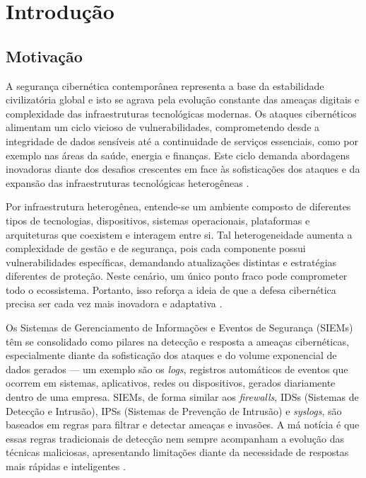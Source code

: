 
\chapter{Introdução}\label{cap:introducao}

\section{Motivação}\label{sec:consideracoesIniciais}

A segurança cibernética contemporânea representa a base da estabilidade civilizatória global e isto se agrava pela evolução constante das ameaças digitais e complexidade das infraestruturas tecnológicas modernas. 
Os ataques cibernéticos alimentam um ciclo vicioso de vulnerabilidades, comprometendo desde a integridade de dados sensíveis até a continuidade de serviços essenciais, como por exemplo nas áreas da saúde, energia e finanças.
Este ciclo demanda abordagens inovadoras diante dos desafios crescentes em face às sofisticações dos ataques e da expansão das infraestruturas tecnológicas heterogêneas \cite{Shah2022}.

Por infraestrutura heterogênea, entende-se um ambiente composto de diferentes tipos de tecnologias, dispositivos, sistemas operacionais, plataformas e arquiteturas que coexistem e interagem entre si. 
Tal heterogeneidade aumenta a complexidade de gestão e de segurança, pois cada componente possui vulnerabilidades específicas, demandando atualizações distintas e estratégias diferentes de proteção. 
Neste cenário, um único ponto fraco pode comprometer todo o ecossistema.
Portanto, isso reforça a ideia de que a defesa cibernética precisa ser cada vez mais inovadora e adaptativa \cite{Shah2022, PaloAlto1, Exabeam1}.

Os Sistemas de Gerenciamento de Informações e Eventos de Segurança (SIEMs) têm se consolidado como pilares na detecção e resposta a ameaças cibernéticas, especialmente diante da sofisticação dos ataques e do volume exponencial de dados gerados --- 
um exemplo são os \textit{logs}, registros automáticos de eventos que ocorrem em sistemas, aplicativos, redes ou dispositivos, gerados diariamente dentro de uma empresa. 
SIEMs, de forma similar aos \textit{firewalls}, IDSs (Sistemas de Detecção e Intrusão), IPSs (Sistemas de Prevenção de Intrusão) e \textit{syslogs}, são baseados em regras para filtrar e detectar ameaças e invasões. 
A má notícia é que essas regras tradicionais de detecção nem sempre acompanham a evolução das técnicas maliciosas, apresentando limitações diante da necessidade de respostas mais rápidas e inteligentes \cite{Shah2022, PodzinsRomanovs}. 

